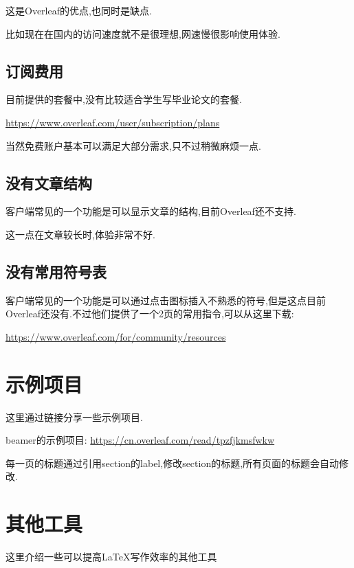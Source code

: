 \documentclass[]{ctexbook}
\begin{document}
这是Overleaf的优点,也同时是缺点.

比如现在在国内的访问速度就不是很理想,网速慢很影响使用体验.

\hypertarget{section-18}{%
\section{订阅费用}\label{section-18}}

目前提供的套餐中,没有比较适合学生写毕业论文的套餐.

\url{https://www.overleaf.com/user/subscription/plans}

当然免费账户基本可以满足大部分需求,只不过稍微麻烦一点.

\hypertarget{section-19}{%
\section{没有文章结构}\label{section-19}}

客户端常见的一个功能是可以显示文章的结构,目前Overleaf还不支持.

这一点在文章较长时,体验非常不好.

\hypertarget{section-20}{%
\section{没有常用符号表}\label{section-20}}

客户端常见的一个功能是可以通过点击图标插入不熟悉的符号,但是这点目前Overleaf还没有.不过他们提供了一个2页的常用指令,可以从这里下载:

\url{https://www.overleaf.com/for/community/resources}

\hypertarget{Overleafproject}{%
\chapter{示例项目}\label{Overleafproject}}

这里通过链接分享一些示例项目.

beamer的示例项目:
\url{https://cn.overleaf.com/read/tpzfjkmsfwkw}

每一页的标题通过引用section的label,修改section的标题,所有页面的标题会自动修改.

\hypertarget{section-21}{%
\chapter{其他工具}\label{section-21}}

这里介绍一些可以提高LaTeX写作效率的其他工具
\end{document}
